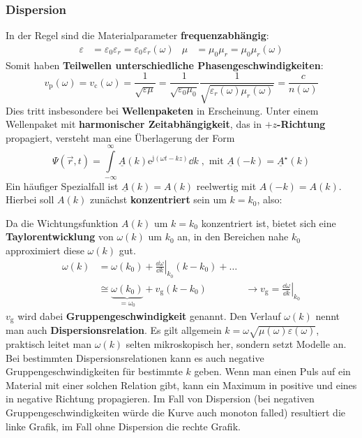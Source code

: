   \subsubsection{Dispersion}
 In der Regel sind die Materialparameter \textbf{frequenzabhängig}:
		        \begin{align}
			        \varepsilon & = \varepsilon_0\varepsilon_r = \varepsilon_0\varepsilon_r(\omega) & \mu & = \mu_0\mu_r = \mu_0\mu_r(\omega)
		        \end{align}
Somit haben \textbf{Teilwellen unterschiedliche Phasengeschwindigkeiten}:
		        \begin{equation}
			        v_\mathrm{p} (\omega) =  v_\mathrm{c}(\omega) = \frac{1}{\sqrt{\varepsilon\mu}} = \frac{1}{\sqrt{\varepsilon_0\mu_0}} \frac{1}{\sqrt{\varepsilon_r(\omega)\mu_r(\omega)}}=\frac{c}{n(\omega)}
		        \end{equation}
Dies tritt insbesondere bei \textbf{Wellenpaketen} in Erscheinung. Unter einem Wellenpaket mit \textbf{harmonischer Zeitabhängigkeit}, das in \textbf{\(+z\)-Richtung} propagiert, versteht man eine Überlagerung der Form
		        \begin{equation}
			        \Psi (\vec{r} , t) = \int\limits_{-\infty}^\infty \underline{A}(k) \mathrm{e}^{\mathrm{j}(\omega t -  k z)} \dd  k\; , \text{ mit } \underline{A}(-k) = \underline{A}^\star(k)
		        \end{equation}
		  Ein häufiger Spezialfall ist $\underline{A}(k) = A(k)$ reelwertig mit $A(-k) = A(k)$. Hierbei soll \(A(k)\) zunächst \textbf{konzentriert} sein um \( k =  k_0\), also:
		        \begin{center}
			        
		        \end{center}
		   Da die Wichtungsfunktion \(A( k)\) um \( k =  k_0\) konzentriert ist, bietet sich eine \textbf{Taylorentwicklung} von \(\omega( k)\) um \( k_0\) an, in den Bereichen nahe $k_0$ approximiert diese \(\omega( k)\) gut.
		        \begin{align}
			        \omega( k) & = \omega( k_0) + \left.\frac{\dd \omega}{\dd  k}\right|_{ k_0} ( k -  k_0) + \ldots                                                                                                                                          \\
			                   & \cong \underbrace{\omega( k_0)}_{=\omega_0} +  v_{\mathrm{g}}( k- k_0)              & \rightarrow\boxed{ v_{\mathrm{g}} = \left.\frac{\dd \omega}{\dd  k}\right|_{ k_0}}
		        \end{align}
		        $v_{\mathrm{g}}$ wird dabei \textbf{Gruppengeschwindigkeit} genannt.
		   Den Verlauf \(\omega( k)\) nennt man auch \textbf{Dispersionsrelation}. Es gilt allgemein $k=\omega\sqrt{\mu(\omega)\varepsilon(\omega)}$, praktisch leitet man $\omega(k)$ selten mikroskopisch her, sondern setzt Modelle an. Bei bestimmten Dispersionsrelationen kann es auch negative Gruppengeschwindigkeiten für bestimmte $k$ geben. Wenn man einen Puls auf ein Material mit einer solchen Relation gibt, kann ein Maximum in positive und eines in negative Richtung propagieren. Im Fall von Dispersion (bei negativen Gruppengeschwindigkeiten würde die Kurve auch monoton falled) resultiert die linke Grafik, im Fall ohne Dispersion die rechte Grafik.
		  
